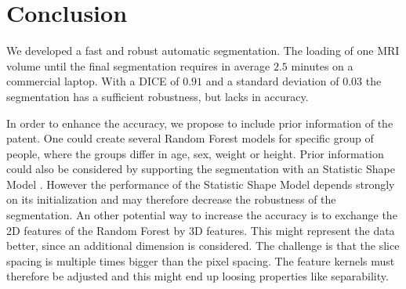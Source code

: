 \section{Conclusion}
We developed a fast and robust automatic segmentation. The loading of one MRI volume until the final segmentation requires in average $2.5$ minutes on a commercial laptop. With a DICE of $0.91$ and a standard deviation of $0.03$ the segmentation has a sufficient robustness, but lacks in accuracy.

In order to enhance the accuracy, we propose to include prior information of the patent. One could create several Random Forest models for specific group of people, where the groups differ in age, sex, weight or height. Prior information could also be considered by supporting the segmentation with an Statistic Shape Model \cite{heimann2009statistical}. However the performance of the Statistic Shape Model depends strongly on its initialization and may therefore decrease the robustness of the segmentation.
An other potential way to increase the accuracy is to exchange the 2D features of the Random Forest by 3D features. This might represent the data better, since an additional dimension is considered. The challenge is that the slice spacing is multiple times bigger than the pixel spacing. The feature kernels must therefore be adjusted and this might end up loosing properties like separability.
